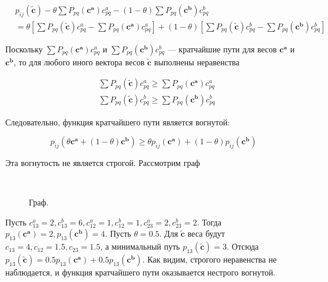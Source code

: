 	\begin{equation}
	\begin{split}
	&p_{ij}(\mathbf{\tilde{c}}) - \theta \sum P_{pq}(\mathbf{c^a}) c_{pq}^a - (1 -
	\theta) \sum P_{pq}(\mathbf{c^b})  c_{pq}^b \\
	&= \theta \left[ \sum P_{pq}(\mathbf{\tilde{c}}) c_{pq}^a - \sum
	P_{pq}(\mathbf{c^a}) c_{pq}^a \right]  + (1 - \theta) \left[ \sum
	P_{pq}(\mathbf{\tilde{c}}) c_{pq}^b - \sum P_{pq}(\mathbf{c^b}) c_{pq}^b\right] 
	\end{split}
	\end{equation}
	
	Поскольку $\sum P_{pq}(\mathbf{c^a}) c_{pq}^a$ и $\sum P_{pq}(\mathbf{c^b})
	c_{pq}^b$ --- кратчайшие пути для весов $\mathbf{c^a}$ и $\mathbf{c^b}$, то для
	любого иного вектора весов $\mathbf{\tilde{c}}$ выполнены неравенства
	
	\begin{equation}
	\begin{split}
	&\sum P_{pq}(\mathbf{\tilde{c}}) c_{pq}^a \geqslant \sum P_{pq}(\mathbf{c^a})
	c_{pq}^a \\
	&\sum P_{pq}(\mathbf{\tilde{c}}) c_{pq}^b \geqslant \sum P_{pq}(\mathbf{c^b})
	c_{pq}^b
	\end{split}
	\end{equation}	
	
	Следовательно, функция кратчайшего пути является вогнутой:
	
	\begin{equation}
	p_{ij}(\theta \mathbf{c^a} + (1 - \theta) \mathbf{c^b}) \geqslant \theta
	p_{ij}( \mathbf{c^a}) + (1-\theta ) p_{ij}( \mathbf{c^b}) 
	\end{equation}
	
	Эта вогнутость не является строгой. Рассмотрим граф
	
	\begin{figure}[H]
		\\
		\caption{Граф.}
	\end{figure}
	
	Пусть $c_{13}^a = 2, c_{13}^b = 6, c_{12}^a = 1, c_{12}^b = 1, c_{23}^a = 2,
	c_{23}^b = 2$. Тогда $p_{13}(\mathbf{c^a}) = 2, p_{13}(\mathbf{c^b}) = 4$. Пусть
	$\theta = 0.5$. Для $\mathbf{\tilde{c}}$ веса будут $c_{13} = 4, c_{12} = 1.5,
	c_{23} = 1.5$, а минимальный путь $p_{13}(\mathbf{\tilde{c}}) = 3$. Отсюда
	$p_{13}(\mathbf{\tilde{c}}) = 0.5 p_{13}(\mathbf{c^a}) + 0.5
	p_{13}(\mathbf{c^b}) $. Как видим, строгого неравенства не наблюдается, и
	функция кратчайшего пути оказывается нестрого вогнутой.
	
